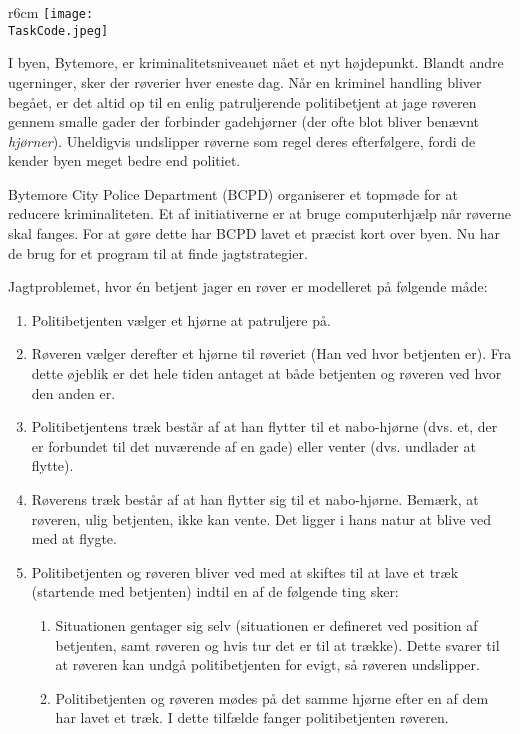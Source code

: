 \documentclass{boi2014-dk}
\renewcommand{\TaskCode}{coprobber}
\begin{document}
    \begin{wrapfigure}[8]{r}{6cm}
        \vspace{-24pt}
		\texttt{[image: \\TaskCode.jpeg]}
	\end{wrapfigure}

	I byen, Bytemore, er kriminalitetsniveauet nået et nyt højdepunkt.
	Blandt andre ugerninger, sker der røverier hver eneste dag.
	Når en kriminel handling bliver begået, er det altid op til
	en enlig patruljerende politibetjent at jage røveren gennem
	smalle gader der forbinder gadehjørner (der ofte blot bliver
	benævnt \emph{hjørner}). Uheldigvis undslipper røverne som regel
	deres efterfølgere, fordi de kender byen meget bedre end politiet.

	Bytemore City Police Department (BCPD) organiserer et topmøde
	for at reducere kriminaliteten. Et af initiativerne er at bruge
	computerhjælp når røverne skal fanges. For at gøre dette har
	BCPD lavet et præcist kort over byen. Nu har de brug for et
	program til at finde jagtstrategier.

	Jagtproblemet, hvor én betjent jager en røver er modelleret på
	følgende måde:
    \begin{enumerate}
    	\item Politibetjenten vælger et hjørne at patruljere på.
    	\item Røveren vælger derefter et hjørne til røveriet
    		  (Han ved hvor betjenten er). Fra dette øjeblik
    		  er det hele tiden antaget at både betjenten og
    		  røveren ved hvor den anden er.
    	\item Politibetjentens træk består af at han flytter til
    		  et nabo-hjørne (dvs. et, der er forbundet til det
    		  nuværende af en gade) eller venter (dvs. undlader
    		  at flytte).
    	\item Røverens træk består af at han flytter sig til et
    		  nabo-hjørne. Bemærk, at røveren, ulig betjenten,
    		  ikke kan vente. Det ligger i hans natur at blive
    		  ved med at flygte.
    	\item Politibetjenten og røveren bliver ved med at skiftes
    		  til at lave et træk (startende med betjenten) indtil
    		  en af de følgende ting sker:
        \begin{enumerate}
        	\item Situationen gentager sig selv (situationen er
        		  defineret ved position af betjenten, samt røveren
        		  og hvis tur det er til at trække). Dette svarer
        		  til at røveren kan undgå politibetjenten for
        		  evigt, så røveren undslipper.
        	\item Politibetjenten og røveren mødes på det samme
        		  hjørne efter en af dem har lavet et træk. I dette
        		  tilfælde fanger politibetjenten røveren.
        \end{enumerate}
    \end{enumerate}
\end{document}
